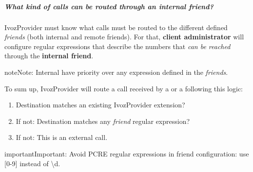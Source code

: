 \documentclass[letterpaper,10pt,english]{sphinxmanual}
\begin{document}
\subparagraph{What kind of calls can be routed through an \emph{internal friend}?}
\label{administration_portal/client/vpbx/routing_endpoints/friends/internal_friends:what-kind-of-calls-can-be-routed-through-an-internal-friend}
IvozProvider must know what calls must be routed to the different defined \emph{friends} (both internal and remote friends).
For that, \textbf{client administrator} will configure regular expressions that
describe the numbers that \emph{can be reached} through the \textbf{internal friend}.

\begin{notice}{note}{Note:}
Internal {\hyperref[administration_portal/client/vpbx/extensions:extensions]{}} have priority over any expression
defined in the \emph{friends}.
\end{notice}

To sum up, IvozProvider will route a call received by a {\hyperref[administration_portal/client/vpbx/users:users]{}} or
a {\hyperref[administration_portal/client/vpbx/routing_endpoints/friends/index:friends]{}} following this logic:
\begin{enumerate}
\item {} 
Destination matches an existing IvozProvider extension?

\item {} 
If not: Destination matches any \emph{friend} regular expression?

\item {} 
If not: This is an external call.

\end{enumerate}

\begin{notice}{important}{Important:}
Avoid PCRE regular expressions in friend configuration: use {[}0-9{]} instead of \textbackslash{}d.
\end{notice}
\end{document}
